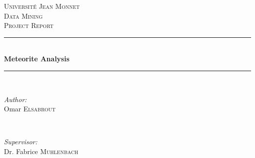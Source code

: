 \begin{titlepage}

\newcommand{\HRule}{\rule{\linewidth}{0.5mm}} %

\center %
 

\textsc{\LARGE Université Jean Monnet}\\[1.5cm] %
\textsc{\Large Data Mining}\\[0.5cm] %
\textsc{\large Project Report}\\[0.5cm] %


\HRule \\[0.4cm]
{ \huge \bfseries Meteorite Analysis}\\[0.4cm] %
\HRule \\[1.5cm]
 

\begin{minipage}{0.4\textwidth}
\begin{flushleft} \large
\emph{Author:}\\
Omar \textsc{Elsabrout} %
\end{flushleft}
\end{minipage}
~
\begin{minipage}{0.4\textwidth}
\begin{flushright} \large
\emph{Supervisor:} \\
Dr. Fabrice \textsc{Muhlenbach} %
\end{flushright}
\end{minipage}\\[2cm]



\end{titlepage}
